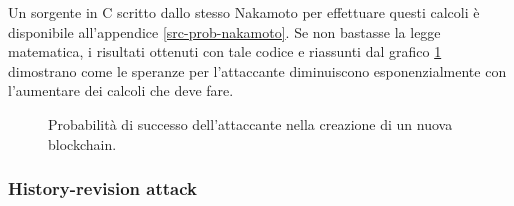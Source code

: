 Un sorgente in C scritto dallo stesso Nakamoto per effettuare questi calcoli è disponibile all'appendice \ref{src-prob-nakamoto}.
Se non bastasse la legge matematica, i risultati ottenuti con tale codice e riassunti dal grafico \ref{grafico-risultati-codice-nakamoto} dimostrano come le speranze per l'attaccante diminuiscono esponenzialmente con l'aumentare dei calcoli che deve fare.

\begin{figure}
  \caption{Probabilità di successo dell'attaccante nella creazione di un nuova blockchain.\label{grafico-risultati-codice-nakamoto}}
\end{figure}

\subsubsection{History-revision attack}\label{history-revision}

